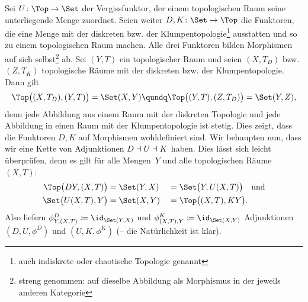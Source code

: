 \begin{thBeispiel}
    \label{ch1:bsp:TopVergiss}
    Sei $U\colon\Top\to\Set$ der Vergissfunktor, der einem topologischen Raum
    seine unterliegende Menge zuordnet. Seien weiter $D,K\colon\Set\to\Top$ die
    Funktoren, die eine Menge mit der diskreten bzw. der
    Klumpentopologie\footnote{auch indiskrete oder chaotische Topologie genannt}
    ausstatten und so zu einem topologischen Raum machen. Alle drei Funktoren
    bilden Morphismen auf sich selbst\footnote{streng genommen: auf dieselbe
    Abbildung als Morphismus in der jeweils anderen Kategorie} ab.
    Sei $(Y,T)$ ein topologischer Raum und seien $(X,T_D)$ bzw. $(Z,T_K)$
    topologische Räume mit der diskreten bzw. der Klumpentopologie. Dann gilt
    \[  \Top\bigl( (X,T_D), (Y,T) \bigr) = \Set(X,Y)  \qundq
        \Top\bigl( (Y,T), (Z,T_D) \bigr) = \Set(Y,Z)
    , \]
    denn jede Abbildung aus einem Raum mit der diskreten Topologie und jede
    Abbildung in einen Raum mit der Klumpentopologie ist stetig. Dies zeigt,
    dass die Funktoren $D,K$ auf Morphismen wohldefiniert sind. Wir behaupten
    nun, dass wir eine Kette von Adjunktionen $D\dashv U\dashv K$
    haben. Dies lässt sich leicht überprüfen, denn es gilt für alle Mengen~$Y$ 
    und alle topologischen Räume $(X,T)$:
    \begin{alignat*}{2}
        \Top\bigl( DY, (X,T) \bigr) &= \Set(Y,X) &&= \Set\bigl( Y, U(X,T)\bigr)
        \quad\text{und}\\
        \Set\bigl( U(X,T), Y \bigr) &= \Set(X,Y) &&= \Top\bigl( (X,T), KY \bigr)
    . \end{alignat*}
    Also liefern $\phi^D_{Y,(X,T)} \defeq \id_{\Set(Y,X)}$ und 
    $\phi^K_{(X,T),Y} \defeq \id_{\Set(X,Y)}$ Adjunktionen $(D,U,\phi^D)$
    und $(U,K,\phi^K)$ (-- die Natürlichkeit ist klar).
\end{thBeispiel}

